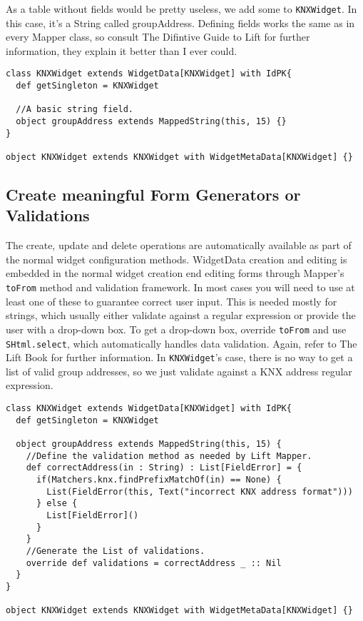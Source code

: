 As a table without fields would be pretty useless, we add some to \lstinline!KNXWidget!. In this case, it's a String called groupAddress. Defining fields works the same as in every Mapper class, so consult The Difintive Guide to Lift\cite[chapter 6: The Mapper and Record Frameworks]{becker:09} for further information, they explain it better than I ever could.

\begin{lstlisting}
class KNXWidget extends WidgetData[KNXWidget] with IdPK{
  def getSingleton = KNXWidget
   
  //A basic string field.
  object groupAddress extends MappedString(this, 15) {}
}  

object KNXWidget extends KNXWidget with WidgetMetaData[KNXWidget] {}
\end{lstlisting}


\subsection{Create meaningful Form Generators or Validations}

The create, update and delete operations are automatically available as part of the normal widget configuration methods. WidgetData creation and editing is embedded in the normal widget creation end editing forms through Mapper's \lstinline!toFrom! method and validation framework. In most cases you will need to use at least one of these to guarantee correct user input. This is needed mostly for strings, which usually either validate against a regular expression or provide the user with a drop-down box. To get a drop-down box, override \lstinline!toFrom! and use \lstinline!SHtml.select!, which automatically handles data validation. Again, refer to The Lift Book\cite[as above]{becker:09} for further information. In \lstinline!KNXWidget!'s case, there is no way to get a list of valid group addresses, so we just validate against a KNX address regular expression.

\begin{lstlisting}
class KNXWidget extends WidgetData[KNXWidget] with IdPK{
  def getSingleton = KNXWidget
   
  object groupAddress extends MappedString(this, 15) {
    //Define the validation method as needed by Lift Mapper.
    def correctAddress(in : String) : List[FieldError] = {
      if(Matchers.knx.findPrefixMatchOf(in) == None) {
        List(FieldError(this, Text("incorrect KNX address format")))
      } else {
        List[FieldError]()
      }
    }
    //Generate the List of validations.
    override def validations = correctAddress _ :: Nil
  }
}  

object KNXWidget extends KNXWidget with WidgetMetaData[KNXWidget] {}
\end{lstlisting}


